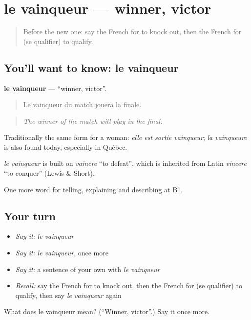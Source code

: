 \section[le vainqueur]{le vainqueur — winner, victor}

\label{lesson:FR-C506-vainqueur}



\begin{quote}
Before the new one: say the French for to knock out, then the French for (se qualifier) to qualify.
\end{quote}

\subsection*{You'll want to know: le vainqueur}
\textbf{le vainqueur} — \textquotedblleft{}winner, victor\textquotedblright{}.

\begin{quote}
Le vainqueur du match jouera la finale.
\end{quote}

\begin{quote}
\emph{The winner of the match will play in the final.}
\end{quote}

Traditionally the same form for a woman: \emph{elle est sortie vainqueur}; \emph{la vainqueure} is also found today, especially in Québec.

\begin{cousinweb}
\emph{le vainqueur} is built on \emph{vaincre} \textquotedblleft{}to defeat\textquotedblright{}, which is inherited from Latin \emph{vincere} \textquotedblleft{}to conquer\textquotedblright{} (Lewis \& Short).
\end{cousinweb}

\begin{grammarlens}[title={What you've built}]
One more word for telling, explaining and describing at B1.
\end{grammarlens}

\subsection*{Your turn}
\begin{itemize}
\raggedright
  \item \emph{Say it:} \emph{le vainqueur}
  \item \emph{Say it:} \emph{le vainqueur}, once more
  \item \emph{Say it:} a sentence of your own with \emph{le vainqueur}
  \item \emph{Recall:} say the French for to knock out, then the French for (se qualifier) to qualify, then say \emph{le vainqueur} again
\end{itemize}

\begin{tcolorbox}[breakable,colback=teal!4,colframe=teal!35!black,title={Before you move on}]
What does le vainqueur mean? (\textquotedblleft{}Winner, victor\textquotedblright{}.) Say it once more.
\end{tcolorbox}
